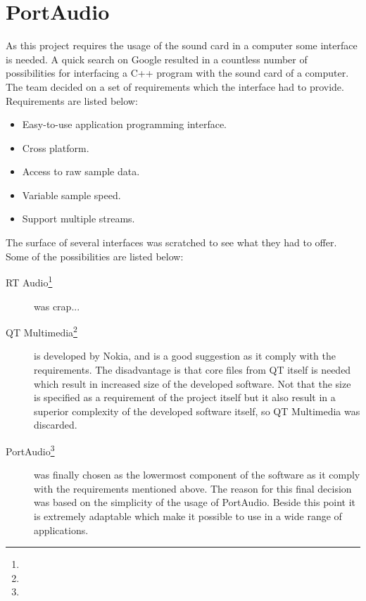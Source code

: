 \chapter{PortAudio}\label{chap:lib}\label{app:portaudio}
As this project requires the usage of the sound card in a computer some interface is needed. A quick search on Google resulted in a countless number of possibilities for interfacing a C++ program with the sound card of a computer. The team decided on a set of requirements which the interface had to provide. Requirements are listed below:

\begin{itemize}
\item Easy-to-use application programming interface.
\item Cross platform.
\item Access to raw sample data.
\item Variable sample speed.
\item Support multiple streams.
\end{itemize}

The surface of several interfaces was scratched to see what they had to offer. Some of the possibilities are listed below:

\begin{description}
\item[RT Audio\footnote{}] was crap...

\item[QT Multimedia\footnote{}] is developed by Nokia, and is a good suggestion as it comply with the requirements. The disadvantage is that core files from QT itself is needed which result in increased size of the developed software. Not that the size is specified as a requirement of the project itself but it also result in a superior complexity of the developed software itself, so QT Multimedia was discarded.

\item[PortAudio\footnote{}] was finally chosen as the lowermost component of the software as it comply with the requirements mentioned above.  The reason for this final decision was based on the simplicity of the usage of PortAudio. Beside this point it is extremely adaptable which make it possible to use in a wide range of applications.
\end{description}